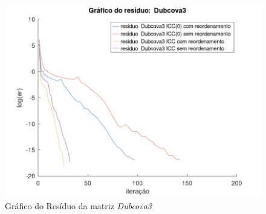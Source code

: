 \begin{figure}[H]
    \centering
         \centering
         \includegraphics[width=.6\linewidth]{images/Dubcova3.png}
         \caption{Gráfico do Resíduo da matriz \textit{Dubcova3}}
         \label{fig:Dub-res}
\end{figure}

